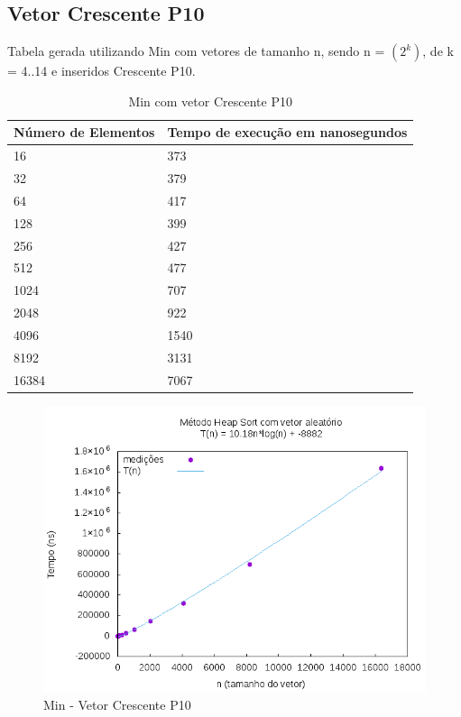 \documentclass[12pt,a4paper,twoside]{report}
\begin{document}
\subsection{Vetor Crescente P10}
Tabela gerada utilizando Min com vetores de tamanho n, sendo n = $(2^k)$, de k = 4..14 e inseridos Crescente P10.
\begin{table}[H]
\centering
\caption{Min com vetor Crescente P10}
\label{my-label}
\begin{tabular}{|l|l|}
\hline
\multicolumn{1}{|c|}{\textbf{Número de Elementos}} & \multicolumn{1}{c|}{\textbf{Tempo de execução em nanosegundos}} \\ \hline
16 & 373 \\ \hline
32 & 379 \\ \hline
64 & 417 \\ \hline
128 & 399 \\ \hline
256 & 427 \\ \hline
512 & 477 \\ \hline
1024 & 707 \\ \hline
2048 & 922 \\ \hline
4096 & 1540 \\ \hline
8192 & 3131 \\ \hline
16384 & 7067 \\ \hline
\end{tabular}
\end{table}

\begin{figure}[H]
    \centering
    \includegraphics[width=0.7\linewidth]{graficos/HeapSort/vIntAleatorio/vIntAleatorio.png}
  \caption{Min - Vetor Crescente P10}
\end{figure}
\end{document}
